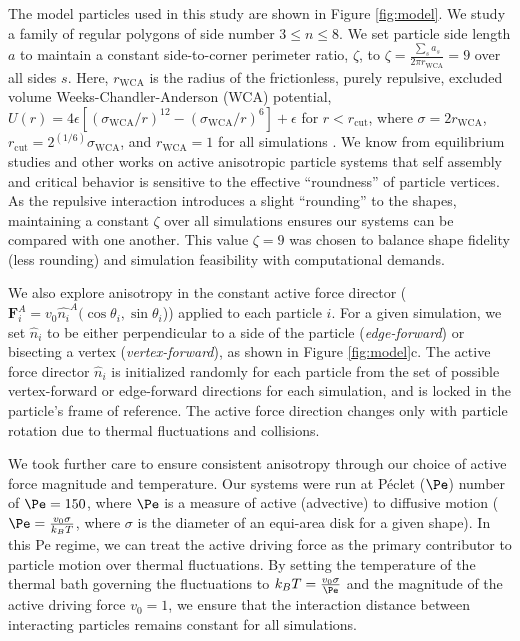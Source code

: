 The model particles used in this study are shown in Figure \ref{fig:model}.
We study a family of regular polygons of side number $3{\leq}n{\leq}8$.
We set particle side length $a$ to maintain a constant side-to-corner perimeter ratio, $\zeta$, to $\zeta = \frac{\sum_s{a_s}}{2\pi r_\text{WCA}}=9$ over all sides $s$.
Here, $r_\text{WCA}$ is the radius of the frictionless, purely repulsive, excluded volume Weeks-Chandler-Anderson (WCA) potential, $U(r)=4\epsilon[(\sigma_\text{WCA}/r)^{12}-(\sigma_\text{WCA}/r)^6]+\epsilon$ for $r<r_\text{cut}$, where $\sigma=2r_\text{WCA}$, $r_\text{cut}=2^{(1/6)}\sigma_\text{WCA}$, and $r_\text{WCA}=1$ for all simulations \cite{WCA_1971}.
We know from equilibrium studies \cite{AvendanoEscobedo_2012_SoftMatter,Zhao_2011_PNAS,Zhao_2009_PRL} and other works on active anisotropic particle systems \cite{Prymidis_2016_SoftMatter} that self assembly and critical behavior is sensitive to the effective ``roundness'' of particle vertices.
As the repulsive interaction introduces a slight ``rounding'' to the shapes, maintaining a constant $\zeta$ over all simulations ensures our systems can be compared with one another.
This value $\zeta=9$ was chosen to balance shape fidelity (less rounding) and simulation feasibility with computational demands.

We also explore anisotropy in the constant active force director ($\bm{F}^A_i=v_0\hat{n_i}^A(\cos{\theta_i}, \sin{\theta_i}$)) applied to each particle $i$.
For a given simulation, we set $\hat{n}_i$ to be either perpendicular to a side of the particle (\textit{edge-forward}) or bisecting a vertex (\textit{vertex-forward}), as shown in Figure \ref{fig:model}c.
The active force director $\hat{n}_i$ is initialized randomly for each particle from the set of possible vertex-forward or edge-forward directions for each simulation, and is locked in the particle's frame of reference.
The active force direction changes only with particle rotation due to thermal fluctuations and collisions.

We took further care to ensure consistent anisotropy through our choice of active force magnitude and temperature.
Our systems were run at P\'{e}clet ($\Pe$) number of $\Pe=150$, where $\Pe$ is a measure of active (advective) to diffusive motion ($\Pe=\frac{v_0\sigma}{k_BT}$, where $\sigma$ is the diameter of an equi-area disk for a given shape).
In this Pe regime, we can treat the active driving force as the primary contributor to particle motion over thermal fluctuations.
By setting the temperature of the thermal bath governing the fluctuations to $k_BT = \frac{v_0\sigma}{\Pe}$ and the magnitude of the active driving force $v_0=1$, we ensure that the interaction distance between interacting particles remains constant for all simulations.

